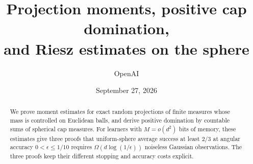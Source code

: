 \documentclass[11pt]{article}
\title{Projection moments, positive cap domination,\\
and Riesz estimates on the sphere}
\author{OpenAI}
\date{September 27, 2026}
\begin{document}
\maketitle
\begin{abstract}
We prove moment estimates for exact random projections of finite measures
whose mass is controlled on Euclidean balls, and derive positive domination
by countable sums of spherical cap measures. For learners with \(M=o(d^2)\)
bits of memory, these estimates give three proofs that uniform-sphere average
success at least \(2/3\) at angular accuracy \(0<\epsilon\le1/10\) requires
\(\Omega(d\log(1/\epsilon))\) noiseless Gaussian observations. The three
proofs keep their different stopping and accuracy costs explicit.
\end{abstract}
\begingroup
\small
\tableofcontents
\endgroup
\clearpage







\end{document}
